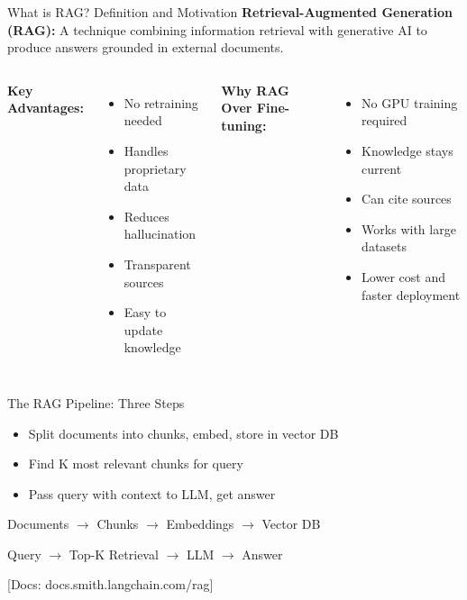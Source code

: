 \documentclass[aspectratio=169,11pt]{beamer}
\newcommand{\docref}[1]{{\scriptsize\color{docgray}[Docs: #1]}}
\begin{document}
\begin{frame}{What is RAG? Definition and Motivation}
  \textbf{\textcolor{lcblue}{Retrieval-Augmented Generation (RAG):}}
  A technique combining information retrieval with generative AI to produce answers grounded in external documents.

  \begin{columns}[T]
    \textbf{Key Advantages:}
    \begin{itemize}
    \setlength{\itemsep}{1pt}
      \item No retraining needed
      \item Handles proprietary data
      \item Reduces hallucination
      \item Transparent sources
      \item Easy to update knowledge
    \end{itemize}

    \textbf{Why RAG Over Fine-tuning:}
    \begin{itemize}
    \setlength{\itemsep}{1pt}
      \item No GPU training required
      \item Knowledge stays current
      \item Can cite sources
      \item Works with large datasets
      \item Lower cost and faster deployment
    \end{itemize}
  \end{columns}
\end{frame}

\begin{frame}{The RAG Pipeline: Three Steps}
  \begin{itemize}
    \setlength{\itemsep}{1pt}
    \item[\textbf{1. Index}] Split documents into chunks, embed, store in vector DB
    \item[\textbf{2. Retrieve}] Find K most relevant chunks for query
    \item[\textbf{3. Generate}] Pass query with context to LLM, get answer
  \end{itemize}
  \vspace{0.8cm}

  \begin{center}
    Documents $\rightarrow$ Chunks $\rightarrow$ Embeddings $\rightarrow$ Vector DB
    \vspace{0.1cm}

    Query $\rightarrow$ Top-K Retrieval $\rightarrow$ LLM $\rightarrow$ Answer
  \end{center}

  \docref{docs.smith.langchain.com/rag}
\end{frame}
\end{document}
